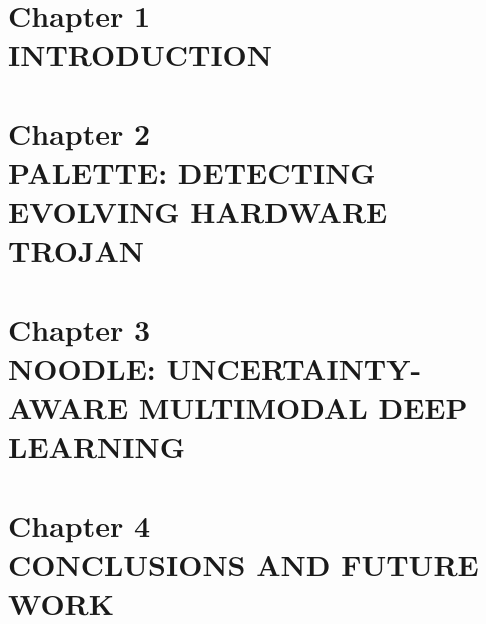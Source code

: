 \documentclass[letterpaper, 12pt]{article}
\begin{document}
\doublespacing
\begin{center}
\tableofcontents
\newpage

{}
\listoftables
\newpage

{}
\listoffigures
\newpage


{}
\section*{Chapter 1 \\INTRODUCTION}

\newpage

{}
\section*{Chapter 2 \\ PALETTE: DETECTING EVOLVING HARDWARE TROJAN}

\newpage

{}
\section*{Chapter 3 \\ NOODLE: UNCERTAINTY-AWARE MULTIMODAL DEEP LEARNING}

\newpage

\iffalse 
\phantomsection
\addcontentsline{toc}{section}{4. SECURING CHAOTIC COMMUNICATION WITH MEMRISTORS}
\section*{Chapter 4 \\ SECURING CHAOTIC COMMUNICATION WITH MEMRISTORS}

\newpage
\fi 

{}
\section*{Chapter 4 \\ CONCLUSIONS AND FUTURE WORK }

\newpage



\end{center}
\end{document}
